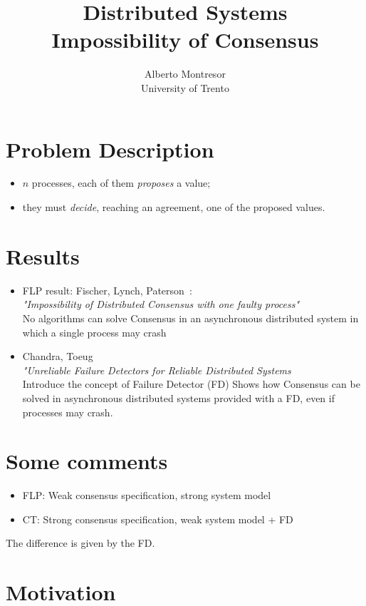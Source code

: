 \documentclass[12pt]{article}
\newcommand{\BI}{\begin{itemize}}
\newcommand{\EI}{\end{itemize}}
\begin{document}
 

\title{Distributed Systems\\Impossibility of Consensus}
\author{Alberto Montresor\\University of Trento}
\maketitle

\section*{Problem Description}

\BI
\item $n$ processes, each of them {\em proposes} a value;
\item they must {\em decide}, reaching an agreement, one of
  the proposed values.
\EI

\section*{Results}

\BI
\item FLP result: Fischer, Lynch, Paterson~\cite{flp85}: \\
  {\em "Impossibility of Distributed Consensus with one faulty process"} \\
  No algorithms can solve Consensus in an asynchronous distributed
  system in which a single process may crash
  
\item Chandra, Toeug~\cite{ct96,cht96} \\
  {\em "Unreliable Failure Detectors for Reliable Distributed Systems} \\
  Introduce the concept of Failure Detector (FD)
  Shows how Consensus can be solved in asynchronous distributed systems
  provided with a FD, even if processes may crash.
\EI

\section*{Some comments}

\BI
\item FLP: Weak consensus specification, strong system model
\item CT: Strong consensus specification, weak system model + FD
\EI
The difference is given by the FD.

\section*{Motivation}
\end{document}
